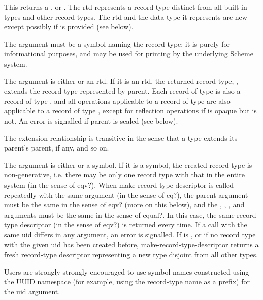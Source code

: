 \begin{entry}{%
}
   
This returns a , or .
The rtd represents a record type distinct from all built-in types and
other record types. The rtd and the data type it represents are new
except possibly if  is provided (see below).

The  argument must be a symbol naming the record type; it is
purely for informational purposes, and may be used for printing by the
underlying Scheme system.

The  argument is either \schfalse{} or an rtd. If it is an
rtd, the returned record type, , extends the record type
 represented by parent. Each record of type  is also a
record of type , and all operations applicable to a record of
type  are also applicable to a record of type , except for
reflection operations if  is opaque but  is not. An error is
signalled if parent is sealed (see below).
   
The extension relationship is transitive in the sense that a type extends
its parent's parent, if any, and so on.
   
The  argument is either \schfalse{} or a symbol. If it is a
symbol, the created record type is non-generative, i.e. there may be
only one record type with that  in the entire system (in the
sense of {\cf eqv?}).  When {\cf make-record-type-descriptor} is
called repeatedly with the same  argument (in the sense of
{\cf eq?}), the parent argument must be the same in the sense of {\cf
  eqv?}  (more on this below), and the , ,
, and  arguments must be the same in the
sense of {\cf equal?}.  In this case, the same record-type descriptor
(in the sense of {\cf eqv?})  is returned every time. If a call with
the same uid differs in any argument, an error is signalled. If
 is \schfalse, or if no record type with the given uid has
been created before, {\cf make-record-type-descriptor} returns a fresh
record-type descriptor representing a new type disjoint from all other
types.

\begin{note}   
  Users are strongly strongly encouraged to use symbol names
  constructed using the UUID namespace (for example, using the
  record-type name as a prefix) for the uid argument.
\end{note}


\end{entry}
